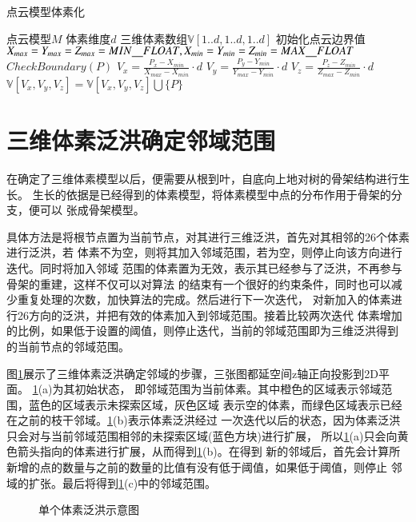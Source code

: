 \begin{algorithm}[H]
	\caption{点云模型体素化}
	\label{alg:voxel}
	\begin{algorithmic}[1] 
	\Require 点云模型$M$
	\Require 体素维度$d$
	\Ensure 三维体素数组$\mathbb{V}[1..d,1..d,1..d]$
	\State 初始化点云边界值$X_{max}=Y_{max}=Z_{max}=MIN\uline\quad FLOAT,X_{min}=Y_{min}=Z_{min}=MAX\uline\quad FLOAT$
		\State $CheckBoundary(P)$
	\EndFor
{}
\State $V_x = \frac{P_x-X_{min}}{X_{max}-X_{min}}\cdot d$
\State $V_y = \frac{P_y-Y_{min}}{Y_{max}-Y_{min}}\cdot d$
\State $V_z = \frac{P_z-Z_{min}}{Z_{max}-Z_{min}}\cdot d$
\State $\mathbb{V}[V_x, V_y, V_z] = \mathbb{V}[V_x, V_y, V_z] \bigcup \{P\} $
	\EndFor
\end{algorithmic}
\end{algorithm}

\section{三维体素泛洪确定邻域范围}
在确定了三维体素模型以后，便需要从根到叶，自底向上地对树的骨架结构进行生长。
生长的依据是已经得到的体素模型，将体素模型中点的分布作用于骨架的分支，便可以
张成骨架模型。

具体方法是将根节点置为当前节点，对其进行三维泛洪，首先对其相邻的26个体素进行泛洪，若
体素不为空，则将其加入邻域范围，若为空，则停止向该方向进行迭代。同时将加入邻域
范围的体素置为无效，表示其已经参与了泛洪，不再参与骨架的重建，这样不仅可以对算法
的结束有一个很好的约束条件，同时也可以减少重复处理的次数，加快算法的完成。然后进行下一次迭代，
对新加入的体素进行26方向的泛洪，并把有效的体素加入到邻域范围。接着比较两次迭代
体素增加的比例，如果低于设置的阈值，则停止迭代，当前的邻域范围即为三维泛洪得到
的当前节点的邻域范围。

图\ref{fig:3dfld}展示了三维体素泛洪确定邻域的步骤，三张图都延空间z轴正向投影到2D平面。
\ref{fig:3dfld}(a)为其初始状态，
即邻域范围为当前体素。其中橙色的区域表示邻域范围，蓝色的区域表示未探索区域，灰色区域
表示空的体素，而绿色区域表示已经在之前的枝干邻域。\ref{fig:3dfld}(b)表示体素泛洪经过
一次迭代以后的状态，因为体素泛洪只会对与当前邻域范围相邻的未探索区域(蓝色方块)进行扩展，
所以\ref{fig:3dfld}(a)只会向黄色箭头指向的体素进行扩展，从而得到\ref{fig:3dfld}(b)。在得到
新的邻域后，首先会计算所新增的点的数量与之前的数量的比值有没有低于阈值，如果低于阈值，则停止
邻域的扩张。最后将得到\ref{fig:3dfld}(c)中的邻域范围。

\begin{figure}[H]
	\centering
	\hspace{4em}
	\hspace{4em}
	\caption{单个体素泛洪示意图}
	\label{fig:3dfld}
\end{figure}


